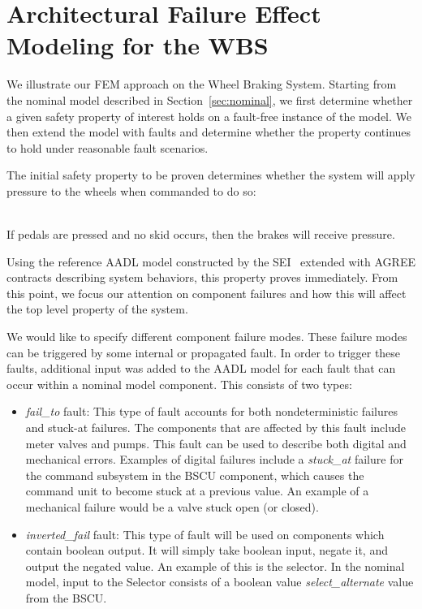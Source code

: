 \section{Architectural Failure Effect Modeling for the WBS}

We illustrate our FEM approach on the Wheel Braking System.  Starting from the nominal model described in Section~\ref{sec:nominal}, we first determine whether a given safety property of interest holds on a fault-free instance of the model.  We then extend the model with faults and determine whether the property continues to hold under reasonable fault scenarios.

The initial safety property to be proven determines whether the system will apply pressure to the wheels when commanded to do so: 

\begin{tt} 
\  \\ 
If pedals are pressed and no skid occurs, then the brakes will receive pressure. \\
\end{tt}

\noindent Using the reference AADL model constructed by the SEI~\cite{SEI:AADL} extended with AGREE contracts describing system behaviors, this property proves immediately.  From this point, we focus our attention on component failures and how this will affect the top level property of the system.

We would like to specify different component failure modes. These failure modes can be triggered by some internal or propagated fault. In order to trigger these faults, additional input was added to the AADL model for each fault that can occur within a nominal model component. This consists of two types: 

\begin{itemize}
\item \textit{fail\_to} fault: This type of fault accounts for both nondeterministic failures and stuck-at failures. The components that are affected by this fault include meter valves and pumps. This fault can be used to describe both digital and mechanical errors. Examples of digital failures include a \textit{stuck\_at} failure for the command subsystem in the BSCU component, which causes the command unit to become stuck at a previous value. An example of a mechanical failure would be a valve stuck open (or closed). 


\item \textit{inverted\_fail} fault: This type of fault will be used on components which contain boolean output. It will simply take boolean input, negate it, and output the negated value. An example of this is the selector. In the nominal model, input to the Selector consists of a boolean value \textit{select\_alternate} value from the BSCU. 

\end{itemize}

